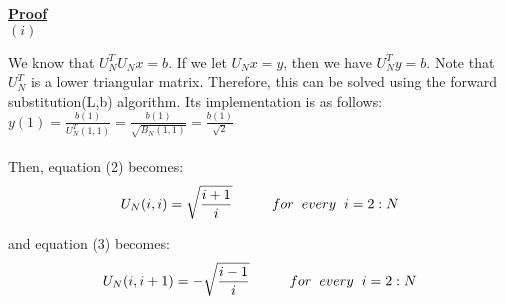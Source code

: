 \documentclass{article}
\begin{document}
\underline{\textbf {Proof}} \\
\((i)\)
\par We know that \(U_N^T  U_N  x = b\). If we let \(U_N x = y\), then we have \(U_N^T y = b\). Note that \(U_N^T\) is a lower triangular matrix. Therefore, this can be solved using the forward substitution(L,b) algorithm. Its implementation is as follows:\\
\indent \(y(1) = \frac{b(1)}{U_N^T(1,1)} = \frac{b(1)}{\sqrt{B_N(1,1)}} = \frac{b(1)}{\sqrt{2}}\) \\\\
Then, equation (2) becomes:\\
\begin{equation}
	U_N(i,i) = \sqrt{\frac{i+1}{i}} \hspace{1 cm} for \hspace{2 mm} every \hspace{2 mm} i=2:N
\end{equation}

and equation (3) becomes: \\
\begin{equation}
	U_N(i,i+1) = -\sqrt{\frac{i-1}{i}} \hspace{1 cm} for \hspace{2 mm} every \hspace{2 mm} i=2:N
\end{equation}
\end{document}
